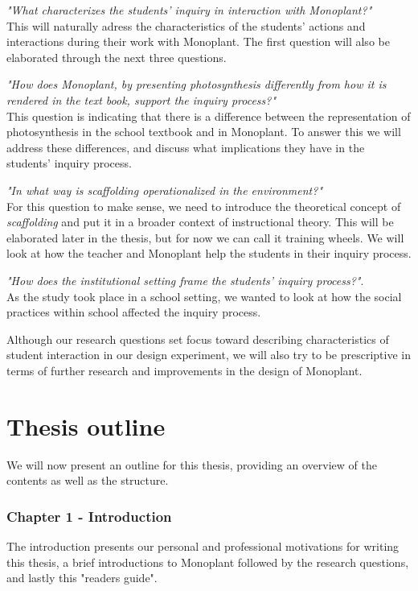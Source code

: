 \begin{noindlist}
\item \emph{"What characterizes the students’ inquiry in interaction with Monoplant?"}\\
This will naturally adress the characteristics of the students' actions and interactions during their work with Monoplant. The first question will also be elaborated through the next three questions.
\item \emph{"How does Monoplant, by presenting photosynthesis differently from how it is rendered in the text book, support the inquiry process?"}\\
This question is indicating that there is a difference between the representation of photosynthesis in the school textbook and in Monoplant. To answer this we will address these differences, and discuss what implications they have in the students' inquiry process.
\item \emph{"In what way is scaffolding operationalized in the environment?"}\\
For this question to make sense, we need to introduce the theoretical concept of \emph{scaffolding} and put it in a broader context of instructional theory. This will be elaborated later in the thesis, but for now we can call it training wheels. We will look at how the teacher and Monoplant help the students in their inquiry process.
\item \emph{"How does the institutional setting frame the students' inquiry process?"}.\\
As the study took place in a school setting, we wanted to look at how the social practices within school affected the inquiry process.
\end{noindlist}

Although our research questions set focus toward describing characteristics of student interaction in our design experiment, we will also try to be prescriptive in terms of further research and improvements in the design of Monoplant.

\section{Thesis outline}
We will now present an outline for this thesis, providing an overview of the contents as well as the structure. 

\subsubsection*{Chapter 1 - Introduction}
The introduction presents our personal and professional motivations for writing this thesis, a brief introductions to Monoplant followed by the research questions, and lastly this "readers guide".

